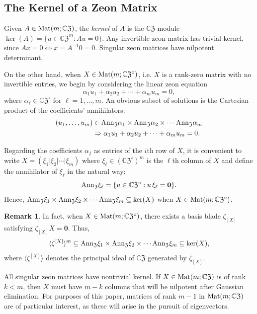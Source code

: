 \documentclass{article}
\theoremstyle{definition}
\newtheorem{remark}[theorem]{Remark}
\newcommand{\CZ}{\mathbb{C}\mathfrak{Z}}
\newcommand{\Mat}{{\rm Mat}}
\newcommand{\Z}{\mathfrak{Z}}
\newcommand{\Ann}{{\rm Ann}_\Z}
\newcommand{\zm}{\mathbf{0}}
\numberwithin{equation}{section}
\begin{document}
\subsection{The Kernel of a Zeon Matrix}

Given $A\in\Mat(m;\CZ)$, the {\em kernel} of $A$ is the $\CZ$-module
$\ker(A)=\{u\in\CZ^m: Au=0\}$.  Any invertible zeon matrix has trivial kernel, since $Ax=0\Leftrightarrow x=A^{-1}0=0$.  Singular zeon matrices have nilpotent determinant.  

On the other hand, when $X\in\Mat(m;\CZ^\circ)$, i.e. $X$ is a rank-zero matrix with no invertible entries, we begin by considering the linear zeon equation \begin{equation*}
\alpha_1u_1+\alpha_2 u_2+\cdots+\alpha_m u_m=0,
\end{equation*}
where $\alpha_\ell\in\CZ^\circ$ for $\ell=1, \ldots, m$.  An obvious subset of solutions is the Cartesian product of the coefficients' annihilators:  \begin{align*}
(u_1, \ldots, u_m)&\in \Ann \alpha_1\times\Ann \alpha_2\times\cdots\Ann \alpha_m\\
&\Rightarrow \alpha_1u_1+\alpha_2 u_2+\cdots+\alpha_m u_m=0.
\end{align*}

Regarding the coefficients $\alpha_j$ as entries of the $i$th row of $X$, it is convenient to write $X=(\xi_1\vert \xi_2\vert\cdots\vert \xi_m)$ where $\xi_\ell\in(\CZ^\circ)^m$ is the $\ell$th column of $X$ and define the annihilator of $\xi_\ell$ in the natural way:  \begin{equation*}
\Ann \xi_\ell=\{u\in\CZ^\circ: u\,\xi_\ell=\zm\}.
\end{equation*}  
Hence, $ \Ann \xi_1\times\Ann \xi_2\times\cdots\Ann \xi_m\subseteq \ker(X)$ when $X\in\Mat(m;\CZ^\circ)$.

\begin{remark}
In fact, when $X\in\Mat(m;\CZ^\circ)$, there exists a basis blade $\zeta_{[X]}$ satisfying $\zeta_{[X]}X=\zm$.  Thus, \begin{equation*}
\langle\zeta^{[X]}\rangle^m\subseteq \Ann \xi_1\times\Ann \xi_2\times\cdots\Ann \xi_m\subseteq \ker(X),
\end{equation*}
where $\langle\zeta^{[X]}\rangle$ denotes the principal ideal of $\CZ$ generated by $\zeta_{[X]}$.
\end{remark} 

All singular zeon matrices have nontrivial kernel.  If $X\in\Mat(m;\CZ)$ is of rank $k<m$, then $X$ must have $m-k$ columns that will be nilpotent after Gaussian elimination.   For purposes of this paper, matrices of rank $m-1$ in $\Mat(m;\CZ)$ are of particular interest, as these will arise in the pursuit of eigenvectors.  
\end{document}

